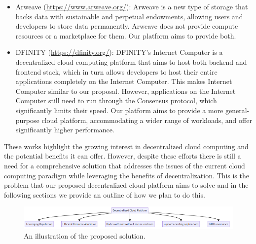 \begin{itemize}
    \item Arweave (\url{https://www.arweave.org/}): Arweave is a new type of storage that backs data with sustainable and perpetual endowments, allowing users and developers to store data permanently. Arweave does not provide compute resources or a marketplace for them. Our platform aims to provide both.

    \item DFINITY (\url{https://dfinity.org/}): DFINITY's Internet Computer is a decentralized cloud computing platform that aims to host both backend and frontend stack, which in turn allows developers to host their entire applications completely on the Internet Computer. This makes Internet Computer similar to our proposal. However, applications on the Internet Computer still need to run through the Consensus protocol, which significantly limits their speed. Our platform aims to provide a more general-purpose cloud platform, accommodating a wider range of workloads, and offer significantly higher performance.
\end{itemize}

These works highlight the growing interest in decentralized cloud computing and the potential benefits it can offer.
However, despite these efforts there is still a need for a comprehensive solution that addresses the issues of the current cloud computing paradigm while leveraging the benefits of decentralization. This is the problem that our proposed decentralized cloud platform aims to solve and in the following sections we provide an outline of how we plan to do this.

\begin{figure}[ht]
    \centering
    \includegraphics[width=\textwidth]{figures/proposed-solution.png}
    \caption{An illustration of the proposed solution.}
\end{figure}
